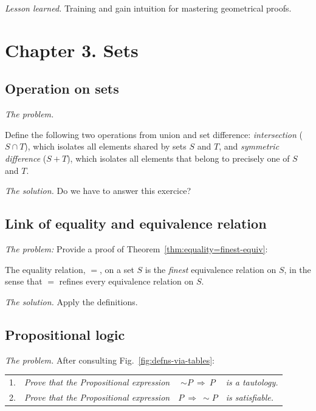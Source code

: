 \noindent \textit{Lesson learned.}
Training and gain intuition for mastering geometrical proofs. 




\section{Chapter 3. Sets}

\subsection{Operation on sets}

\noindent \textit{The problem.}

Define the following two operations from union and set
difference: {\it intersection} ($S \cap T$), which isolates all
elements shared by sets $S$ and $T$, and {\it symmetric difference}
($S+T$), which isolates all elements that belong to precisely one of
$S$ and $T$.
\medskip

\noindent \textit{The solution.}
{\Denis Do we have to answer this exercice?}


\subsection{Link of equality and equivalence relation}

\noindent \textit{The problem:}
Provide a proof of Theorem~\ref{thm:equality=finest-equiv}:

The equality relation, $=$, on a set $S$ is the {\em finest}
equivalence relation on $S$, in the sense that $=$ refines every
equivalence relation on $S$.
\medskip

\noindent \textit{The solution.}
Apply the definitions. 


\subsection{Propositional logic}

\noindent \textit{The problem.}
After consulting Fig.~\ref{fig:defns-via-tables}:

\begin{tabular}{llcl}
1. &
{\it Prove that the Propositional expression} &
$\sim P \ \Rightarrow \ P$ &
{\it is a tautology.} \\
2. &
{\it Prove that the Propositional expression} &
$P \ \Rightarrow \ \sim P$ &
{\it is satisfiable.}
\end{tabular}

